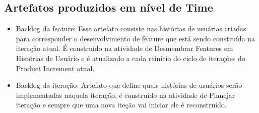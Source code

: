 \subsection{Artefatos produzidos em nível de Time}
\begin{itemize}
\item Backlog da feature: Esse artefato consiste nas histórias de usuárias criadas para corresponder o desenvolvimento de feature que está sendo construída na iteração atual. É construído na atividade de Desmembrar Features em Histórias de Usuário e é atualizado a cada reinício do ciclo de iterações do Product Increment atual.
\item Backlog da iteração: Artefato que define quais histórias de usuários serão implementadas naquela iteração, é construído na atividade de Planejar iteração e sempre que uma nova iteção vai iniciar ele é reconstruído.
\end{itemize}